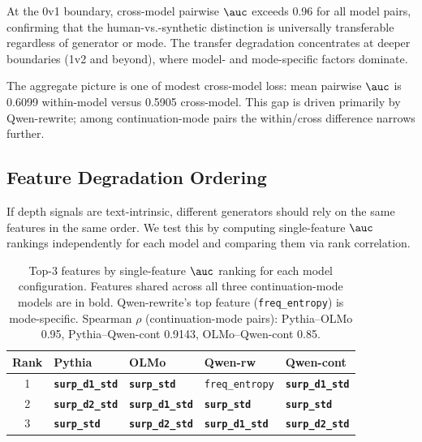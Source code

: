 At the 0v1 boundary, cross-model pairwise $\auc$ exceeds 0.96
for all model pairs, confirming that the human-vs.-synthetic
distinction is universally transferable regardless of generator
or mode.
The transfer degradation concentrates at deeper boundaries
(1v2 and beyond), where model- and mode-specific factors dominate.

The aggregate picture is one of modest cross-model loss:
mean pairwise $\auc$ is 0.6099 within-model versus 0.5905
cross-model.
This gap is driven primarily by Qwen-rewrite; among
continuation-mode pairs the within/cross difference narrows
further.

\subsection{Feature Degradation Ordering}
\label{sec:feature_degradation}

If depth signals are text-intrinsic, different generators should
rely on the same features in the same order.
We test this by computing single-feature $\auc$ rankings
independently for each model and comparing them via rank
correlation.

\begin{table}[t]
\centering
\small
\caption{Top-3 features by single-feature $\auc$ ranking for each
model configuration.
Features shared across all three continuation-mode models are in bold.
Qwen-rewrite's top feature (\texttt{freq\_entropy}) is mode-specific.
Spearman $\rho$ (continuation-mode pairs): Pythia--OLMo 0.95,
Pythia--Qwen-cont 0.9143, OLMo--Qwen-cont 0.85.}
\label{tab:top_features}
\begin{tabular}{cllll}
\toprule
Rank & Pythia & OLMo & Qwen-rw & Qwen-cont \\
\midrule
1
  & \textbf{\texttt{surp\_d1\_std}}
  & \textbf{\texttt{surp\_std}}
  & \texttt{freq\_entropy}
  & \textbf{\texttt{surp\_d1\_std}} \\
2
  & \textbf{\texttt{surp\_d2\_std}}
  & \textbf{\texttt{surp\_d1\_std}}
  & \textbf{\texttt{surp\_std}}
  & \textbf{\texttt{surp\_std}} \\
3
  & \textbf{\texttt{surp\_std}}
  & \textbf{\texttt{surp\_d2\_std}}
  & \textbf{\texttt{surp\_d1\_std}}
  & \textbf{\texttt{surp\_d2\_std}} \\
\bottomrule
\end{tabular}
\end{table}

